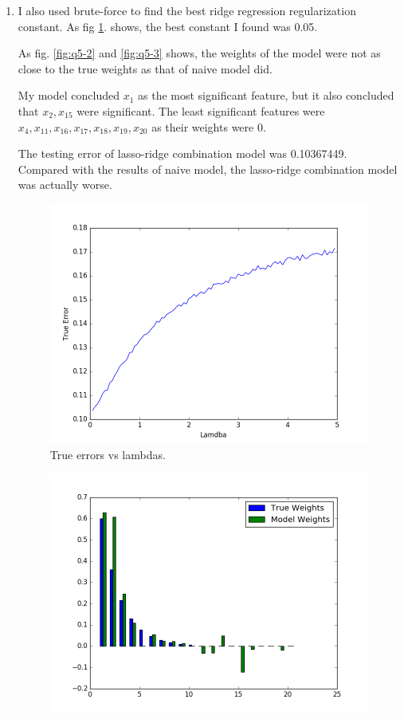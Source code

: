 \documentclass[letter, 12pt]{article}
\begin{document}
\begin{enumerate}
    	\item {}
    	\par{I also used brute-force to find the best ridge regression regularization constant. As fig \ref{fig:q5-1}. shows, the best constant I found was 0.05.}
    	\par{As fig. \ref{fig:q5-2} and \ref{fig:q5-3} shows, the weights of the model were not as close to the true weights as that of naive model did. }
    	\par{My model concluded $ x_1 $ as the most significant feature, but it also concluded that $ x_{2}, x_{15} $ were significant. The least significant features were $ x_4, x_{11}, x_{16}, x_{17}, x_{18}, x_{19}, x_{20} $ as their weights were 0. }
    	\par{The testing error of lasso-ridge combination model was 0.10367449. Compared with the results of naive model, the lasso-ridge combination model was actually worse.}
    	\begin{figure}[H]
    		\centering
    		\centering
    		\includegraphics[width=0.7\linewidth]{q5-1.png}
    		\caption{True errors vs lambdas.}
    		\label{fig:q5-1}
    	\end{figure}
    	\begin{figure}[H]
    		\centering
    		\begin{minipage}{.48\textwidth}
    			\centering
    			\includegraphics[width=\linewidth]{q5-2.png}

\end{minipage}
\end{figure}
\end{enumerate}
\end{document}
